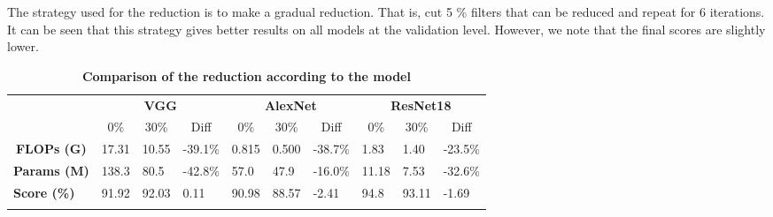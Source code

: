 \documentclass[12pt]{article}
\begin{document}
The strategy used for the reduction is to make a gradual reduction. That is, cut 5 \% filters that can be reduced and repeat for 6 iterations. It can be seen that this strategy gives better results on all models at the validation level. However, we note that the final scores are slightly lower.
\begin{table}[H]
	\caption {\textbf{Comparison of the reduction according to the model}}
	\begin{tabular}{cccccccccc}
		\multicolumn{1}{l}{\textbf{}}           & \multicolumn{3}{c}{\textbf{VGG}}                                                                            & \multicolumn{3}{c}{\textbf{AlexNet}}                                                                        & \multicolumn{3}{c}{\textbf{ResNet18}}                                                                      \\
		\multicolumn{1}{l}{}                    & 0\%                       & 30\%                      & Diff                                                & 0\%                       & 30\%                      & Diff                                                & 0\%                       & 30\%                      & Diff                                               \\ \cline{2-10} 
		\multicolumn{1}{c|}{\textbf{FLOPs (G)}}  & \multicolumn{1}{l}{17.31} & \multicolumn{1}{l}{10.55} & \multicolumn{1}{l|}{{\color[HTML]{009901} -39.1\%}} & \multicolumn{1}{l}{0.815} & \multicolumn{1}{l}{0.500} & \multicolumn{1}{l|}{{\color[HTML]{009901} -38.7\%}} & \multicolumn{1}{l}{1.83}  & \multicolumn{1}{l}{1.40}  & \multicolumn{1}{l}{{\color[HTML]{009901} -23.5\%}} \\
		\multicolumn{1}{c|}{\textbf{Params (M)}} & \multicolumn{1}{l}{138.3} & \multicolumn{1}{l}{80.5}  & \multicolumn{1}{l|}{{\color[HTML]{009901} -42.8\%}} & \multicolumn{1}{l}{57.0}  & \multicolumn{1}{l}{47.9}  & \multicolumn{1}{l|}{{\color[HTML]{009901} -16.0\%}} & \multicolumn{1}{l}{11.18} & \multicolumn{1}{l}{7.53}  & \multicolumn{1}{l}{{\color[HTML]{009901} -32.6\%}} \\
		\multicolumn{1}{l|}{\textbf{Score (\%)}} & \multicolumn{1}{l}{91.92} & \multicolumn{1}{l}{92.03} & \multicolumn{1}{l|}{{\color[HTML]{009901} 0.11}}    & \multicolumn{1}{l}{90.98} & \multicolumn{1}{l}{88.57} & \multicolumn{1}{l|}{{\color[HTML]{9A0000} -2.41}}   & \multicolumn{1}{l}{94.8}  & \multicolumn{1}{l}{93.11} & \multicolumn{1}{l}{{\color[HTML]{9A0000} -1.69}}   \\ \hline
		\multicolumn{1}{l}{}                    & \multicolumn{1}{l}{}      & \multicolumn{1}{l}{}      & \multicolumn{1}{l}{}                                & \multicolumn{1}{l}{}      & \multicolumn{1}{l}{}      & \multicolumn{1}{l}{}                                & \multicolumn{1}{l}{}      & \multicolumn{1}{l}{}      & \multicolumn{1}{l}{}                               \\

\end{tabular}
\end{table}
\end{document}

